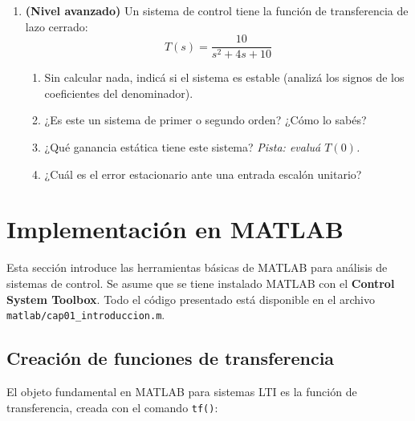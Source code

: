\begin{enumerate}
  \item \textbf{(Nivel avanzado)} Un sistema de control tiene la función
    de transferencia de lazo cerrado:
    \begin{equation*}
      T(s) = \frac{10}{s^2 + 4s + 10}
    \end{equation*}
    \begin{enumerate}
      \item Sin calcular nada, indicá si el sistema es estable (analizá los
        signos de los coeficientes del denominador).
      \item ¿Es este un sistema de primer o segundo orden? ¿Cómo lo sabés?
      \item ¿Qué ganancia estática tiene este sistema? \textit{Pista: evaluá $T(0)$.}
      \item ¿Cuál es el error estacionario ante una entrada escalón unitario?
    \end{enumerate}
\end{enumerate}

\section{Implementación en MATLAB}
\label{sec:intro-matlab}

Esta sección introduce las herramientas básicas de MATLAB para análisis de
sistemas de control. Se asume que se tiene instalado MATLAB con el
\textbf{Control System Toolbox}. Todo el código presentado está disponible
en el archivo \texttt{matlab/cap01\_introduccion.m}.

\subsection{Creación de funciones de transferencia}

El objeto fundamental en MATLAB para sistemas LTI es la función de
transferencia, creada con el comando \texttt{tf()}:


